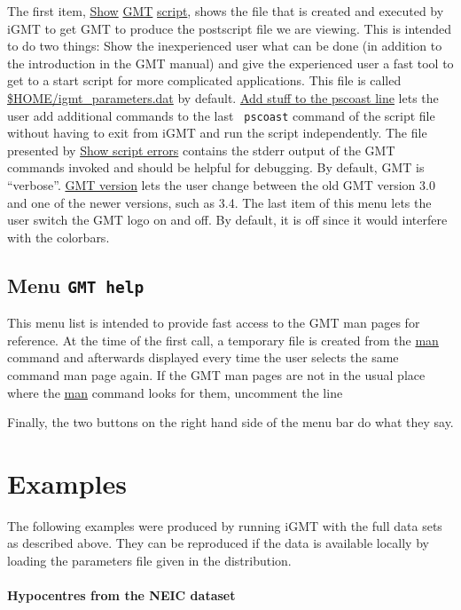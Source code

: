 \documentclass[11pt]{article}
\begin{document}
The first item, \url{Show} \url{GMT} \url{script}, shows the file that
is created and executed by iGMT to get GMT to produce the postscript
file we are viewing. This is intended to do two things: Show the
inexperienced user what can be done (in addition to the introduction
in the GMT manual) and give the experienced user a fast tool to get to
a start script for more complicated applications. This file is called
\url{$HOME/igmt_parameters.dat} by default. \url{Add stuff to the
  pscoast line} lets the user add additional commands to the last {\tt
  pscoast} command of the script file without having to exit from iGMT
and run the script independently. The file presented by \url{Show
  script errors} contains the stderr output of the GMT commands
invoked and should be helpful for debugging. By default, GMT is
``verbose''.  \url{GMT version} lets the user change between the old
GMT version 3.0 and one of the newer versions, such as 3.4.  The last
item of this menu lets the user switch the GMT logo on and off. By
default, it is off since it would interfere with the colorbars.

\subsection{Menu {\tt GMT help}}
This menu list is intended to provide fast access to the GMT man pages
for reference. At the time of the first call, a temporary file is
created from the \url{man} command and afterwards displayed every time
the user selects the same command man page again. If the GMT man pages
are not in the usual place where the \url{man} command looks for them,
uncomment the line

Finally, the two buttons on the right hand side of the menu bar do
what they say.


\section{Examples\label{examples}}
The following examples were produced by running iGMT with the full
data sets as described above. They can be reproduced if the data is
available locally by loading the parameters file given in the
distribution.

\paragraph{Hypocentres from the NEIC dataset}
\end{document}
